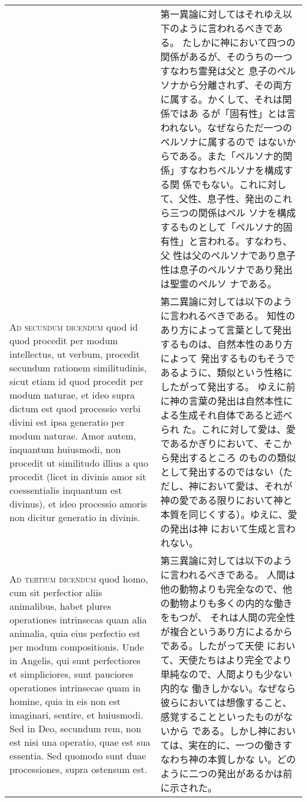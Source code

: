 \documentclass[10pt]{jsarticle} %
\begin{document}
\begin{longtable}{p{21em}p{21em}}
&

第一異論に対してはそれゆえ以下のように言われるべきである。
たしかに神において四つの関係があるが、そのうちの一つすなわち霊発は父と
 息子のペルソナから分離されず、その両方に属する。かくして、それは関係ではあ
 るが「固有性」とは言われない。なぜならただ一つのペルソナに属するので
 はないからである。また「ペルソナ的関係」すなわちペルソナを構成する関
 係でもない。これに対して、父性、息子性、発出のこれら三つの関係はペル
 ソナを構成するものとして「ペルソナ的固有性」と言われる。すなわち、父
 性は父のペルソナであり息子性は息子のペルソナであり発出は聖霊のペルソ
 ナである。


\\



{\scshape Ad secundum dicendum} quod id quod procedit per modum intellectus, ut
verbum, procedit secundum rationem similitudinis, sicut etiam id quod
procedit per modum naturae, et ideo supra dictum est quod processio
verbi divini est ipsa generatio per modum naturae. Amor autem,
inquantum huiusmodi, non procedit ut similitudo illius a quo procedit
(licet in divinis amor sit coessentialis inquantum est divinus), et
ideo processio amoris non dicitur generatio in divinis.

&

第二異論に対しては以下のように言われるべきである。
知性のあり方によって言葉として発出するものは、自然本性のあり方によって
 発出するものもそうであるように、類似という性格にしたがって発出する。
 ゆえに前に神の言葉の発出は自然本性による生成それ自体であると述べられ
 た。これに対して愛は、愛であるかぎりにおいて、そこから発出するところ
 のものの類似として発出するのではない（ただし、神において愛は、それが
 神の愛である限りにおいて神と本質を同じくする）。ゆえに、愛の発出は神
 において生成と言われない。

\\



{\scshape Ad tertium dicendum} quod homo, cum sit perfectior aliis animalibus,
habet plures operationes intrinsecas quam alia animalia, quia eius
perfectio est per modum compositionis. Unde in Angelis, qui sunt
perfectiores et simpliciores, sunt pauciores operationes intrinsecae
quam in homine, quia in eis non est imaginari, sentire, et
huiusmodi. Sed in Deo, secundum rem, non est nisi una operatio, quae
est sua essentia. Sed quomodo sunt duae processiones, supra ostensum
est.

&

第三異論に対しては以下のように言われるべきである。
人間は他の動物よりも完全なので、他の動物よりも多くの内的な働きをもつが、
 それは人間の完全性が複合というあり方によるからである。したがって天使
 において、天使たちはより完全でより単純なので、人間よりも少ない内的な
 働きしかない。なぜなら彼らにおいては想像すること、感覚することといったものがないから
 である。しかし神においては、実在的に、一つの働きすなわち神の本質しかな
 い。どのように二つの発出があるかは前に示された。




\end{longtable}
\end{document}
